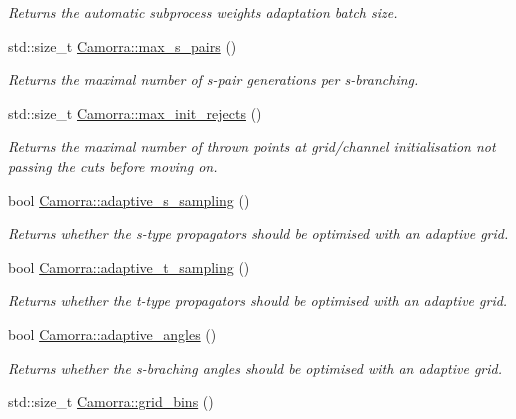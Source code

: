 \begin{DoxyCompactItemize}
\begin{DoxyCompactList}\small\item\em Returns the automatic subprocess weights adaptation batch size. \end{DoxyCompactList}\item 
\hypertarget{a00798_ac97f5f2467de9e46507d5f01081375cf}{
std::size\_\-t \hyperlink{a00798_ac97f5f2467de9e46507d5f01081375cf}{Camorra::max\_\-s\_\-pairs} ()}
\label{a00798_ac97f5f2467de9e46507d5f01081375cf}

\begin{DoxyCompactList}\small\item\em Returns the maximal number of s-\/pair generations per s-\/branching. \end{DoxyCompactList}\item 
std::size\_\-t \hyperlink{a00798_ae431c1ee83b717ad5ee259ea0b29e46d}{Camorra::max\_\-init\_\-rejects} ()
\begin{DoxyCompactList}\small\item\em Returns the maximal number of thrown points at grid/channel initialisation not passing the cuts before moving on. \end{DoxyCompactList}\item 
bool \hyperlink{a00798_a54293db384f71be66101216d13cd5b13}{Camorra::adaptive\_\-s\_\-sampling} ()
\begin{DoxyCompactList}\small\item\em Returns whether the s-\/type propagators should be optimised with an adaptive grid. \end{DoxyCompactList}\item 
bool \hyperlink{a00798_a249c2403f0350fffedf4785f6348924e}{Camorra::adaptive\_\-t\_\-sampling} ()
\begin{DoxyCompactList}\small\item\em Returns whether the t-\/type propagators should be optimised with an adaptive grid. \end{DoxyCompactList}\item 
bool \hyperlink{a00798_af43bdefe26b0a357ead80b081285b99f}{Camorra::adaptive\_\-angles} ()
\begin{DoxyCompactList}\small\item\em Returns whether the s-\/braching angles should be optimised with an adaptive grid. \end{DoxyCompactList}\item 
\hypertarget{a00798_a5febf7380bc1a76257efddb93a86f603}{
std::size\_\-t \hyperlink{a00798_a5febf7380bc1a76257efddb93a86f603}{Camorra::grid\_\-bins} ()}
\label{a00798_a5febf7380bc1a76257efddb93a86f603}


\end{DoxyCompactItemize}
